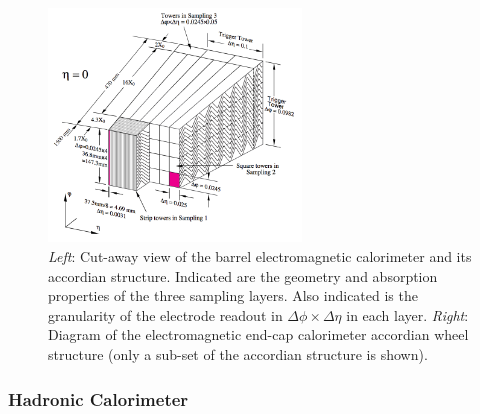 \begin{figure}[!htb]
    \begin{center}
        \includegraphics[width=0.6\textwidth]{figures/chapter2/calorimeters/atlas_em_calo_barrel}
        \caption{
            \textit{Left}: Cut-away view of the barrel electromagnetic calorimeter and its accordian
                structure. Indicated are
                the geometry and absorption properties of the three sampling layers.
                Also indicated is the granularity of the electrode readout in $\Delta \phi \times \Delta \eta$
                in each layer.
            \textit{Right}: Diagram of the electromagnetic end-cap calorimeter accordian wheel structure
                (only a sub-set of the accordian structure is shown).
        }
        \label{fig:em_calo_section}
    \end{center}
\end{figure}

\FloatBarrier
\subsubsection{Hadronic Calorimeter}
\label{sec:calo_had}

